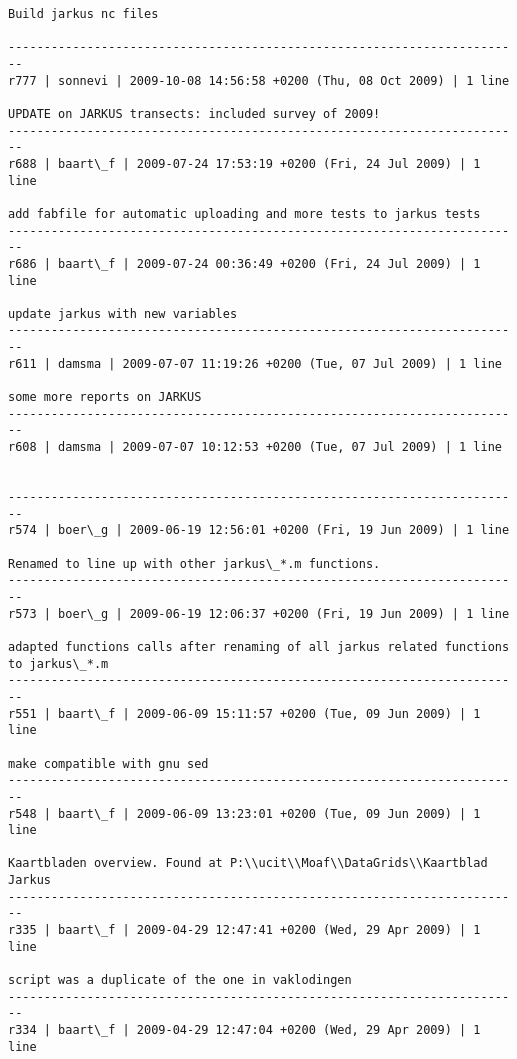 \documentclass[9]{report}
\begin{document}
\begin{description}
\begin{verbatim}
Build jarkus nc files

------------------------------------------------------------------------
r777 | sonnevi | 2009-10-08 14:56:58 +0200 (Thu, 08 Oct 2009) | 1 line

UPDATE on JARKUS transects: included survey of 2009!
------------------------------------------------------------------------
r688 | baart\_f | 2009-07-24 17:53:19 +0200 (Fri, 24 Jul 2009) | 1 line

add fabfile for automatic uploading and more tests to jarkus tests
------------------------------------------------------------------------
r686 | baart\_f | 2009-07-24 00:36:49 +0200 (Fri, 24 Jul 2009) | 1 line

update jarkus with new variables
------------------------------------------------------------------------
r611 | damsma | 2009-07-07 11:19:26 +0200 (Tue, 07 Jul 2009) | 1 line

some more reports on JARKUS
------------------------------------------------------------------------
r608 | damsma | 2009-07-07 10:12:53 +0200 (Tue, 07 Jul 2009) | 1 line


------------------------------------------------------------------------
r574 | boer\_g | 2009-06-19 12:56:01 +0200 (Fri, 19 Jun 2009) | 1 line

Renamed to line up with other jarkus\_*.m functions.
------------------------------------------------------------------------
r573 | boer\_g | 2009-06-19 12:06:37 +0200 (Fri, 19 Jun 2009) | 1 line

adapted functions calls after renaming of all jarkus related functions to jarkus\_*.m
------------------------------------------------------------------------
r551 | baart\_f | 2009-06-09 15:11:57 +0200 (Tue, 09 Jun 2009) | 1 line

make compatible with gnu sed
------------------------------------------------------------------------
r548 | baart\_f | 2009-06-09 13:23:01 +0200 (Tue, 09 Jun 2009) | 1 line

Kaartbladen overview. Found at P:\\ucit\\Moaf\\DataGrids\\Kaartblad Jarkus
------------------------------------------------------------------------
r335 | baart\_f | 2009-04-29 12:47:41 +0200 (Wed, 29 Apr 2009) | 1 line

script was a duplicate of the one in vaklodingen
------------------------------------------------------------------------
r334 | baart\_f | 2009-04-29 12:47:04 +0200 (Wed, 29 Apr 2009) | 1 line


\end{verbatim}
\end{description}
\end{document}
